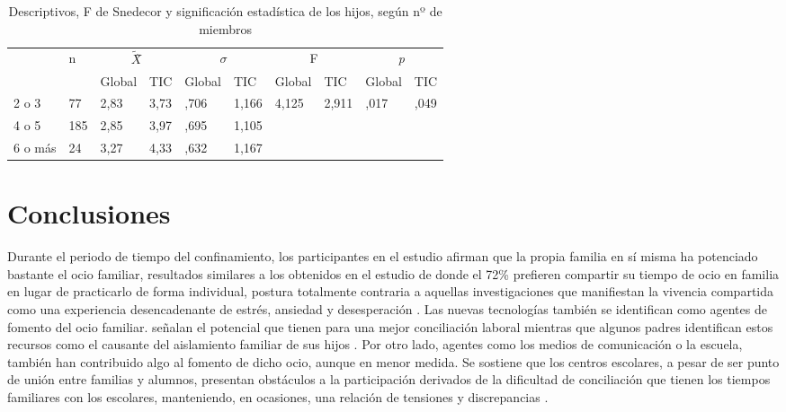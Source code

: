 \documentclass[spanish]{textolivre}
\begin{document}
\begin{table}[htpb]
\caption{Descriptivos, F de Snedecor y significación estadística de los hijos, según nº de miembros}
\label{tab6}
\centering
\begin{tabular}{llllllllll}
\toprule
& \multirow{2}{*}{n} & \multicolumn{2}{c}{$\tilde{X}$̃} & \multicolumn{2}{c}{\begin{math}\sigma\end{math}} & \multicolumn{2}{c}{F} & \multicolumn{2}{c}{\emph{p}}
\\
& & Global & TIC & Global & TIC & Global & TIC & Global & TIC
\\
\midrule
2 o 3 & 77 & 2,83 & 3,73 & ,706 & 1,166 & 4,125 & 2,911 & ,017 & ,049
\\
4 o 5 & 185 & 2,85 & 3,97 & ,695 & 1,105 & & & &
\\
6 o más & 24 & 3,27 & 4,33 & ,632 & 1,167 & & & &
\\
\bottomrule
\end{tabular}
\centering
{}
\end{table}

\section{Conclusiones}
Durante el periodo de tiempo del confinamiento, los participantes en el estudio afirman que la propia familia en sí misma ha potenciado bastante el ocio familiar, resultados similares a los obtenidos en el estudio de \textcite{medina2021} donde el 72\% prefieren compartir su tiempo de ocio en familia en lugar de practicarlo de forma individual, postura totalmente contraria a aquellas investigaciones que manifiestan la vivencia compartida como una experiencia desencadenante de estrés, ansiedad y desesperación \cite{vazquezsoto2020, zayas-fajardo2021}. Las nuevas tecnologías también se identifican como agentes de fomento del ocio familiar. \textcite{vaziri2020} señalan el potencial que tienen para una mejor conciliación laboral mientras que algunos padres identifican estos recursos como el causante del aislamiento familiar de sus hijos \cite{drouin2020}. Por otro lado, agentes como los medios de comunicación o la escuela, también han contribuido algo al fomento de dicho ocio, aunque en menor medida. Se sostiene que los centros escolares, a pesar de ser punto de unión entre familias y alumnos, presentan obstáculos a la participación derivados de la dificultad de conciliación que tienen los tiempos familiares con los escolares, manteniendo, en ocasiones, una relación de tensiones y discrepancias \cite{moreno2020}.
\end{document}
